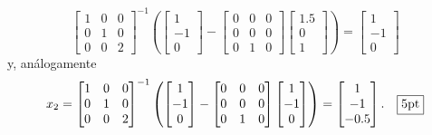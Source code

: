 \documentclass[11pt]{article}
\begin{document}
\begin{enumerate}
$$\begin{bmatrix}
1 & 0 & 0\\
0 & 1 & 0\\
0 & 0 & 2
\end{bmatrix}^{-1} 
\left(
\begin{bmatrix} 1 \\-1\\0 \end{bmatrix}
-
\begin{bmatrix}
0 & 0 & 0 \\
0 & 0 & 0 \\
0 & 1 & 0
\end{bmatrix}
\begin{bmatrix}
1.5\\0\\1
\end{bmatrix}
\right)
=\begin{bmatrix}
1\\-1\\0
\end{bmatrix}
$$
y, an\'alogamente
$$
x_2=
\begin{bmatrix}
1 & 0 & 0\\
0 & 1 & 0\\
0 & 0 & 2
\end{bmatrix}^{-1} 
\left(
\begin{bmatrix} 1 \\-1\\0 \end{bmatrix}
-
\begin{bmatrix}
0 & 0 & 0 \\
0 & 0 & 0 \\
0 & 1 & 0
\end{bmatrix}
\begin{bmatrix}
1\\-1\\0
\end{bmatrix}
\right)
=
\begin{bmatrix}
1 \\ -1 \\ -0.5
\end{bmatrix}. \quad \fbox{5pt}
$$
\end{enumerate}
\end{document}
